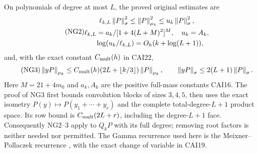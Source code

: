On polynomials of degree at most $L$, the proved original estimates are
\begin{equation}\tag{NG2}
 \begin{gathered}
 \ell_{k,L}\left\lVert P\right\rVert_\sigma^2\le\left\lVert P\right\rVert_{\mu_k}^2
 \le u_k\left\lVert P\right\rVert_\sigma^2,\\
 \ell_{k,L}=a_k/[1+4(L+M)^2]^M,
 \quad u_k=A_k,\\
 \quad \log(u_k/\ell_{k,L})=O_h(k+\log(L+1)),
 \end{gathered}
\end{equation}
and, with the exact constant $C_{\rm mult}(h)$ in CAI22,
\begin{equation}\tag{NG3}
 \left\lVert yP\right\rVert_{\mu_k}\le C_{\rm mult}(h)(2L+\lfloor k/3\rfloor)
                    \left\lVert P\right\rVert_{\mu_k},\qquad
 \left\lVert yP\right\rVert_\sigma\le2(L+1)\left\lVert P\right\rVert_\sigma.
\end{equation}
Here $M=21+4m_0$ and $a_k,A_k$ are the positive full-mass constants
CAI16. The proof of NG3 first bounds convolution blocks of sizes $3,4,5$,
then uses the exact isometry $P(y)\mapsto P(y_1+\cdots+y_r)$ and the
complete total-degree-$L+1$ product space. Its row bound is
$C_{\rm mult}(2L+r)$, including the degree-$L+1$ face. Consequently
NG2--3 apply to $Q_kP$ with its full degree; removing root factors is
neither needed nor permitted. The Gamma recurrence used here is the
Meixner--Pollaczek recurrence \cite[18.22.8,18.23.7]{garnative:dlmf}, with the exact
change of variable in CAI19.

